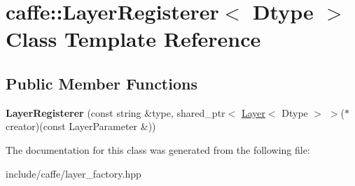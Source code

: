 \hypertarget{classcaffe_1_1LayerRegisterer}{}\section{caffe\+:\+:Layer\+Registerer$<$ Dtype $>$ Class Template Reference}
\label{classcaffe_1_1LayerRegisterer}
\subsection*{Public Member Functions}
\begin{DoxyCompactItemize}
\item 
{\bfseries Layer\+Registerer} (const string \&type, shared\+\_\+ptr$<$ \hyperlink{classcaffe_1_1Layer}{Layer}$<$ Dtype $>$ $>$($\ast$creator)(const Layer\+Parameter \&))\hypertarget{classcaffe_1_1LayerRegisterer_aa4c1f10f5e2ceb65e5be3e1970ce6bde}{}\label{classcaffe_1_1LayerRegisterer_aa4c1f10f5e2ceb65e5be3e1970ce6bde}

\end{DoxyCompactItemize}


The documentation for this class was generated from the following file\+:\begin{DoxyCompactItemize}
\item 
include/caffe/layer\+\_\+factory.\+hpp\end{DoxyCompactItemize}
